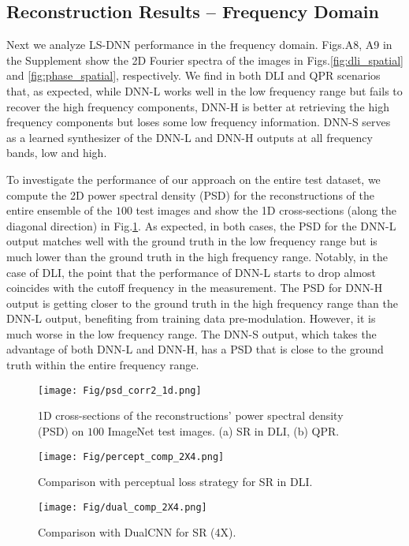 \documentclass[10pt,twocolumn,letterpaper]{article}
\begin{document}
\subsection{Reconstruction Results -- Frequency Domain}
Next we analyze LS-DNN performance in the frequency domain. Figs.A8, A9 in the Supplement show the 2D Fourier spectra of the images in Figs.\ref{fig:dli_spatial} and \ref{fig:phase_spatial}, respectively. We find in both DLI and QPR scenarios that, as expected, while DNN-L works well in the low frequency range but fails to recover the high frequency components, DNN-H is better at retrieving the high frequency components but loses some low frequency information. DNN-S serves as a learned synthesizer of the DNN-L and DNN-H outputs at all frequency bands, low and high.

To investigate the performance of our approach on the entire test dataset, we compute the 2D power spectral density (PSD) for the reconstructions of the entire ensemble of the $100$ test images and show the 1D cross-sections (along the diagonal direction) in Fig.\ref{fig:psd_1d}. As expected, in both cases, the PSD for the DNN-L output matches well with the ground truth in the low frequency range but is much lower than the ground truth in the high frequency range. Notably, in the case of DLI, the point that the performance of DNN-L starts to drop almost coincides with the cutoff frequency in the measurement. The PSD for DNN-H output is getting closer to the ground truth in the high frequency range than the DNN-L output, benefiting from  training data pre-modulation. However, it is much worse in the low frequency range. The DNN-S output, which takes the advantage of both DNN-L and DNN-H, has a PSD that is close to the ground truth within the entire frequency range.  

\begin{figure}[h!]
\centering\texttt{[image: Fig/psd\_corr2\_1d.png]}
\caption{1D cross-sections of the reconstructions' power spectral density (PSD) on $100$ ImageNet test images. (a) SR in DLI, (b) QPR.}
\label{fig:psd_1d}
\end{figure}

\begin{figure*}[h!]
\centering\texttt{[image: Fig/percept\_comp\_2X4.png]}
\caption{Comparison with perceptual loss strategy \cite{johnson2016perceptual} for SR in DLI.}
\label{fig:perc_SR}
\end{figure*}

\begin{figure*}[h!]
\centering\texttt{[image: Fig/dual\_comp\_2X4.png]}
\caption{Comparison with DualCNN \cite{Pan_2018_CVPR} for SR (4X).}
\label{fig:compare}
\end{figure*}
\end{document}
